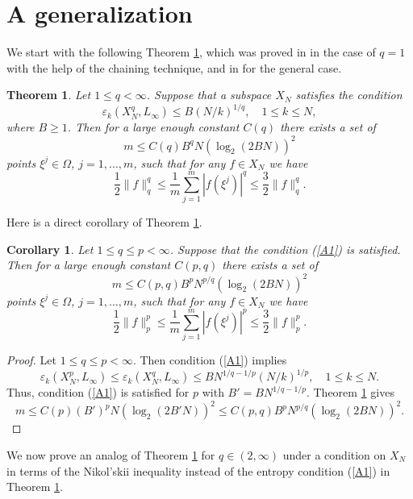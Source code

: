 \documentclass[12pt]{article}
\def \e{\varepsilon}
\newtheorem{Theorem}{Theorem}[section]
\newtheorem{Corollary}{Corollary}[section]
\numberwithin{equation}{section}
\newcommand{\be}{\begin{equation}}
\newcommand{\ee}{\end{equation}}
\begin{document}
\section{A generalization} 
\label{A}

We start with the following 
 Theorem \ref{AT1}, which was proved in \cite{VT159} in the case of  $q=1$  with the help of the chaining technique, and in \cite{DPSTT1} for the general case. 

\begin{Theorem}\label{AT1} Let $1\le q<\infty$. Suppose that a subspace $X_N$ satisfies the condition
\be\label{A1}
\e_k(X^q_N,L_\infty) \le  B (N/k)^{1/q}, \quad 1\leq k\le N,
\ee
where $B\ge 1$.
Then for a large enough constant $C(q)$ there exists a set of
$$
m \le C(q)B^{q}N(\log_2(2BN))^2
$$
 points $\xi^j\in \Omega$, $j=1,\dots,m$,   such that for any $f\in X_N$
we have
$$
\frac{1}{2}\|f\|_q^q \le \frac{1}{m}\sum_{j=1}^m |f(\xi^j)|^q \le \frac{3}{2}\|f\|_q^q.
$$
\end{Theorem}

Here  is a direct corollary of Theorem \ref{AT1}.

\begin{Corollary}\label{AC1} Let $1\le q \le p<\infty$. Suppose that the  condition (\ref{A1}) is satisfied. Then for a large enough constant $C(p,q)$ there exists a set of
$$
m \le C(p,q)B^{p}N^{p/q} (\log_2(2BN))^2
$$
 points $\xi^j\in \Omega$, $j=1,\dots,m$,   such that for any $f\in X_N$
we have
$$
\frac{1}{2}\|f\|_p^p \le \frac{1}{m}\sum_{j=1}^m |f(\xi^j)|^p \le \frac{3}{2}\|f\|_p^p.
$$
\end{Corollary}
\begin{proof} 
  Let $1\le q\le p <\infty$. Then condition (\ref{A1})
implies
\be\label{A2}
\e_k(X^p_N,L_\infty)\le  \e_k(X^q_N,L_\infty) \le  BN^{1/q-1/p} (N/k)^{1/p}, \quad 1\leq k\le N.
\ee
Thus, condition (\ref{A1}) is satisfied for $p$ with $B'=BN^{1/q-1/p}$. Theorem \ref{AT1} gives
$$
m \le C(p)(B')^{p}N(\log_2(2B'N))^2 \le C(p,q)B^{p}N^{p/q}(\log_2(2BN))^2.
$$
\end{proof}

We now prove an analog of Theorem \ref{AT1} for $q\in (2,\infty)$ under a condition on $X_N$ in terms of the Nikol'skii inequality instead of the entropy condition (\ref{A1}) in Theorem \ref{AT1}. 
\end{document}
